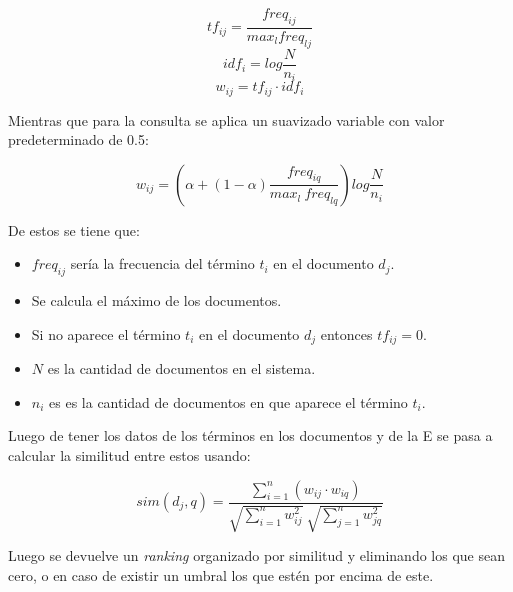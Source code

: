 \documentclass[spanish]{article}
\begin{document}
		\begin{equation}
			\displaystyle tf_{ij} =  \frac{freq_{ij}}{max_l freq_{lj}}
		\end{equation}
		\begin{equation}
			\displaystyle idf_i =  log{\frac{N}{n_i}}
		\end{equation}
		\begin{equation}
			\displaystyle w_{ij} = tf_{ij} \cdot idf_i
		\end{equation}

		Mientras que para la consulta se aplica un suavizado variable con valor predeterminado de 0.5:
		
		\begin{equation}
			\displaystyle w_{ij} = \left( \alpha + 
\left( 1 - \alpha \right) \frac{freq_{iq}}{max_l \ freq_{lq}} \right) log \frac{N}{n_i}
		\end{equation}

		De estos se tiene que:

		\begin{itemize}
			\item $ freq_{ij} $ sería la frecuencia del término $ t_i $ en el documento $ d_j $.

			\item Se calcula el máximo de los documentos.

			\item Si no aparece el término $ t_i $ en el documento $ d_j $ entonces $ tf_{ij} = 0 $.

			\item $ N $ es la cantidad de documentos en el sistema.

			\item $ n_i $ es es la cantidad de documentos en que aparece el término $ t_i $.
		\end{itemize}

		Luego de tener los datos de los términos en los documentos y de la E se pasa a calcular la similitud entre estos usando:
	
		\begin{equation}
			\displaystyle sim \left(d_j, q \right) = \displaystyle \frac{\displaystyle\sum_{i=1}^n (w_{ij} \cdot w_{iq})}{\sqrt{\displaystyle\sum_{i=1}^n w_{ij}^2} \ \sqrt{\displaystyle\sum_{j=1}^n w_{jq}^2}}
		\end{equation}

		Luego se devuelve un \emph{ranking} organizado por similitud y eliminando los que sean cero, o en caso de existir un umbral los que estén por encima de este.
\end{document}
